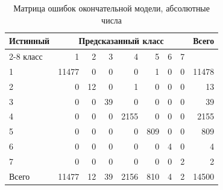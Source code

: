 \begin{table}[H]
\centering
\footnotesize
\caption{Матрица ошибок окончательной модели, абсолютные числа}\label{tab:confcounts}
\begin{tabular}{lrrrrrrrr}
\toprule
Истинный & \multicolumn{7}{c}{Предсказанный класс} & Всего \\
\cmidrule(lr){2-8}
класс & 1 & 2 & 3 & 4 & 5 & 6 & 7 & \\
\midrule
1 & 11477 & 0 & 0 & 0 & 1 & 0 & 0 & 11478 \\
2 & 0 & 12 & 0 & 1 & 0 & 0 & 0 & 13 \\
3 & 0 & 0 & 39 & 0 & 0 & 0 & 0 & 39 \\
4 & 0 & 0 & 0 & 2155 & 0 & 0 & 0 & 2155 \\
5 & 0 & 0 & 0 & 0 & 809 & 0 & 0 & 809 \\
6 & 0 & 0 & 0 & 0 & 0 & 4 & 0 & 4 \\
7 & 0 & 0 & 0 & 0 & 0 & 0 & 2 & 2 \\
\midrule
Всего & 11477 & 12 & 39 & 2156 & 810 & 4 & 2 & 14500 \\
\bottomrule
\end{tabular}
\end{table}